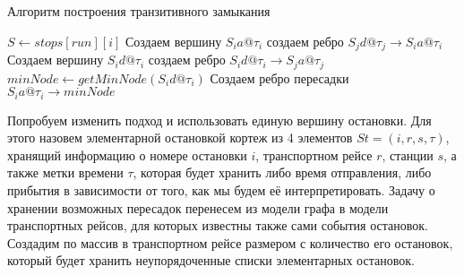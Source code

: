 \begin{algorithm}[!h]
	\caption{Алгоритм построения транзитивного замыкания}\label{lst3}
	\begin{algorithmic}
		\State $S \gets stops[run][i]$ 
		\State Создаем вершину $S_ia@\tau_i$
		\State создаем ребро $S_jd@\tau_j \rightarrow S_ia@\tau_i$
		\EndFor
		\State Создаем вершину $S_id@\tau_i$
		\State создаем ребро $S_id@\tau_i \rightarrow S_ja@\tau_j$
		\EndFor
		\State $minNode \gets getMinNode(S_id@\tau_i)$ 
		\State Создаем ребро пересадки $S_ia@\tau_i \rightarrow minNode$
		\EndFor
		\EndFor
		\EndFunction
	\end{algorithmic}
\end{algorithm}

Попробуем изменить подход и использовать единую вершину остановки. Для этого назовем элементарной остановкой кортеж из 4 элементов $St=(i, r, s, \tau)$, хранящий информацию о номере остановки $i$, транспортном рейсе $r$, станции $s$, а также метки времени $\tau$, которая будет хранить либо время отправления, либо прибытия в зависимости от того, как мы будем её интерпретировать. Задачу о хранении возможных пересадок перенесем из модели графа в модели транспортных рейсов, для которых известны также сами события остановок. Создадим по массив в транспортном рейсе размером с количество его остановок, который будет хранить неупорядоченные списки элементарных остановок.

